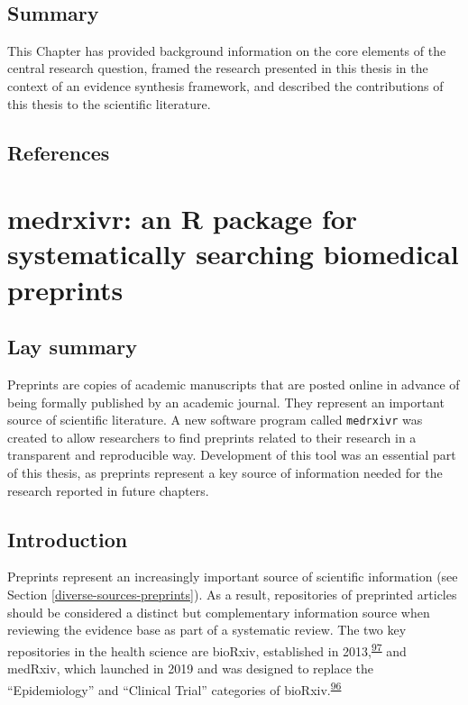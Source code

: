 \documentclass[a4paper, twoside]{templates/ociamthesis}
\begin{document}
~

\hypertarget{summary}{%
\section{Summary}\label{summary}}

This Chapter has provided background information on the core elements of the central research question, framed the research presented in this thesis in the context of an evidence synthesis framework, and described the contributions of this thesis to the scientific literature.

\newpage

\hypertarget{references}{%
\section{References}\label{references}}



\hypertarget{sys-rev-tools-heading}{%
\chapter{medrxivr: an R package for systematically searching biomedical preprints}\label{sys-rev-tools-heading}}

\minitoc 

\hypertarget{lay-summary-1}{%
\section{Lay summary}\label{lay-summary-1}}

Preprints are copies of academic manuscripts that are posted online in advance of being formally published by an academic journal. They represent an important source of scientific literature. A new software program called \texttt{medrxivr} was created to allow researchers to find preprints related to their research in a transparent and reproducible way. Development of this tool was an essential part of this thesis, as preprints represent a key source of information needed for the research reported in future chapters.

\hypertarget{sys-rev-tools-intro}{%
\section{Introduction}\label{sys-rev-tools-intro}}

Preprints represent an increasingly important source of scientific information (see Section \ref{diverse-sources-preprints}). As a result, repositories of preprinted articles should be considered a distinct but complementary information source when reviewing the evidence base as part of a systematic review. The two key repositories in the health science are bioRxiv, established in 2013,\textsuperscript{\protect\hyperlink{ref-sever2019}{97}} and medRxiv, which launched in 2019 and was designed to replace the ``Epidemiology'' and ``Clinical Trial'' categories of bioRxiv.\textsuperscript{\protect\hyperlink{ref-rawlinson2019}{96}}
\end{document}

